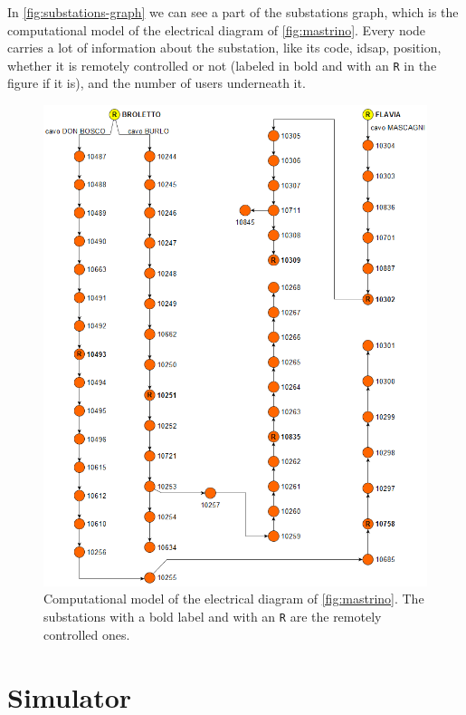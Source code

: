 In \autoref{fig:substations-graph} we can see a part of the substations graph, which is the computational model of the electrical diagram of \autoref{fig:mastrino}. Every node carries a lot of information about the substation, like its code, idsap, position, whether it is remotely controlled or not (labeled in bold and with an \texttt{R} in the figure if it is), and the number of users underneath it.


\begin{figure}[htbp]
    \centering
    \includegraphics[scale=0.7]{chapters/figures/Substations_graph.PNG}
    \caption{Computational model of the electrical diagram of \autoref{fig:mastrino}. The substations with a bold label and with an \texttt{R} are the remotely controlled ones.}
    \label{fig:substations-graph}
\end{figure}


\section{Simulator}

